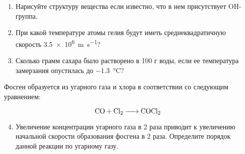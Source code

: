 

\begin{enumerate}
    \item Нарисуйте структуру вещества  если известно, что в нем присутствует OH-группа.
    \item При какой температуре атомы гелия будут иметь среднеквадратичную скорость \qty{3.5e6}{\meter\per\second}?
    \item Сколько грамм сахара было растворено в 100 г воды, если ее температура замерзания опустилась до \qty{-1.3}{\celsius}?
\end{enumerate}

Фосген образуется из угарного газа и хлора в соответствии со следующим уравнением:

\begin{equation*}
    \ce{CO + Cl2 -> COCl2}
\end{equation*}

\begin{enumerate}
\setcounter{enumi}{3}
    \item Увеличение концентрации угарного газа в 2 раза приводит к увеличению начальной скорости образования фосгена в 2 раза. Определите порядок данной реакции по угарному газу.
\end{enumerate}